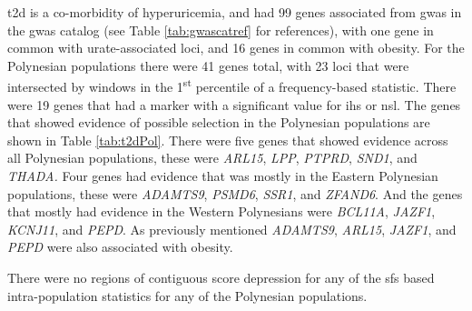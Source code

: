 \documentclass[]{report}
\begin{document}
\Gls{t2d} is a co-morbidity of hyperuricemia, and had 99 genes
associated from \gls{gwas} in the \gls{gwas} catalog (see Table
\ref{tab:gwascatref} for references), with one gene in common with
urate-associated loci, and 16 genes in common with obesity. For the
Polynesian populations there were 41 genes total, with 23 loci that were
intersected by windows in the 1\textsuperscript{st} percentile of a
frequency-based statistic. There were 19 genes that had a marker with a
significant value for \gls{ihs} or \gls{nsl}. The genes that showed
evidence of possible selection in the Polynesian populations are shown
in Table \ref{tab:t2dPol}. There were five genes that showed evidence
across all Polynesian populations, these were \emph{ARL15}, \emph{LPP},
\emph{PTPRD}, \emph{SND1}, and \emph{THADA.} Four genes had evidence
that was mostly in the Eastern Polynesian populations, these were
\emph{ADAMTS9}, \emph{PSMD6}, \emph{SSR1}, and \emph{ZFAND6}. And the
genes that mostly had evidence in the Western Polynesians were
\emph{BCL11A}, \emph{JAZF1}, \emph{KCNJ11}, and \emph{PEPD}. As
previously mentioned \emph{ADAMTS9}, \emph{ARL15}, \emph{JAZF1}, and
\emph{PEPD} were also associated with obesity.

There were no regions of contiguous score depression for any of the
\gls{sfs} based intra-population statistics for any of the Polynesian
populations.

\begingroup\fontsize{8}{10}\selectfont
\end{document}
